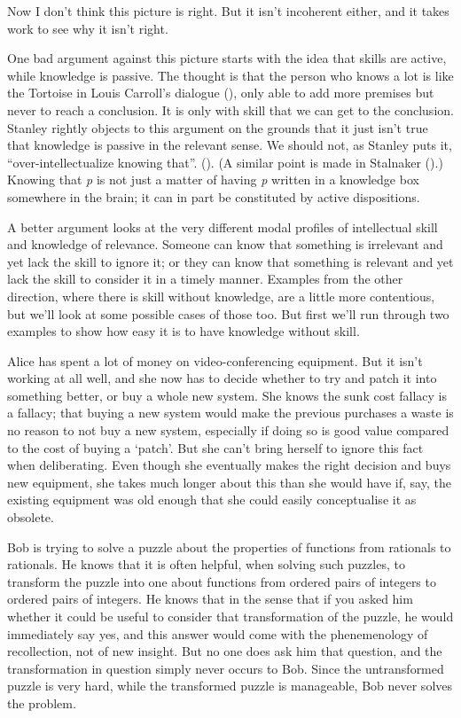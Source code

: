 \documentclass[
  11pt,
  letterpaper,
  DIV=11,
  numbers=noendperiod,
  oneside]{scrartcl}
\begin{document}
Now I don't think this picture is right. But it isn't incoherent either,
and it takes work to see why it isn't right.

One bad argument against this picture starts with the idea that skills
are active, while knowledge is passive. The thought is that the person
who knows a lot is like the Tortoise in Louis Carroll's dialogue
(), only able to add more
premises but never to reach a conclusion. It is only with skill that we
can get to the conclusion. Stanley rightly objects to this argument on
the grounds that it just isn't true that knowledge is passive in the
relevant sense. We should not, as Stanley puts it,
``over-intellectualize knowing that''.
(). (A similar
point is made in Stalnaker ().)
Knowing that \emph{p} is not just a matter of having \emph{p} written in
a knowledge box somewhere in the brain; it can in part be constituted by
active dispositions.

A better argument looks at the very different modal profiles of
intellectual skill and knowledge of relevance. Someone can know that
something is irrelevant and yet lack the skill to ignore it; or they can
know that something is relevant and yet lack the skill to consider it in
a timely manner. Examples from the other direction, where there is skill
without knowledge, are a little more contentious, but we'll look at some
possible cases of those too. But first we'll run through two examples to
show how easy it is to have knowledge without skill.

Alice has spent a lot of money on video-conferencing equipment. But it
isn't working at all well, and she now has to decide whether to try and
patch it into something better, or buy a whole new system. She knows the
sunk cost fallacy is a fallacy; that buying a new system would make the
previous purchases a waste is no reason to not buy a new system,
especially if doing so is good value compared to the cost of buying a
`patch'. But she can't bring herself to ignore this fact when
deliberating. Even though she eventually makes the right decision and
buys new equipment, she takes much longer about this than she would have
if, say, the existing equipment was old enough that she could easily
conceptualise it as obsolete.

Bob is trying to solve a puzzle about the properties of functions from
rationals to rationals. He knows that it is often helpful, when solving
such puzzles, to transform the puzzle into one about functions from
ordered pairs of integers to ordered pairs of integers. He knows that in
the sense that if you asked him whether it could be useful to consider
that transformation of the puzzle, he would immediately say yes, and
this answer would come with the phenemenology of recollection, not of
new insight. But no one does ask him that question, and the
transformation in question simply never occurs to Bob. Since the
untransformed puzzle is very hard, while the transformed puzzle is
manageable, Bob never solves the problem.
\end{document}
